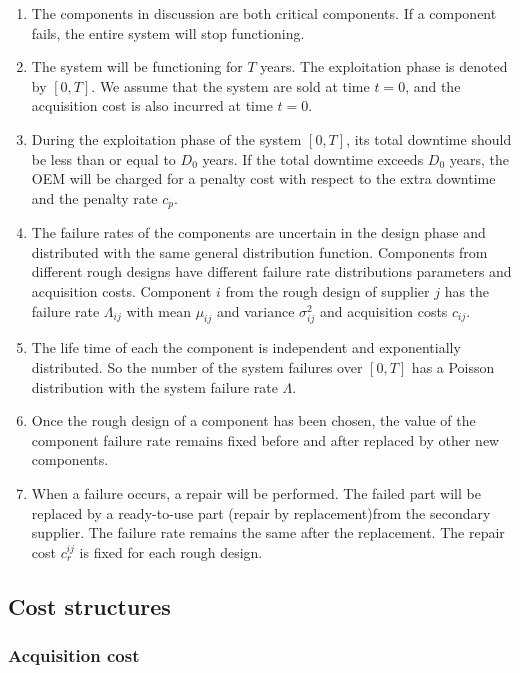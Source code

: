 \documentclass[preprint,12pt]{elsarticle}
\begin{document}
   \begin{enumerate}
   \item The components in discussion are both critical components. If a component fails, the entire system will stop functioning.
  \item The system will be functioning for $T$ years. The exploitation phase is denoted by $[0, T]$. We assume that the system are sold at time $t=0$, and the acquisition cost is also incurred at time $t=0$.
	 \item During the exploitation phase of the system $[0, T]$, its total downtime should be less than or equal to $D_0$ years. If the total downtime exceeds $D_0$ years, the OEM will be charged for a penalty cost with respect to the extra downtime and the penalty rate $c_p$.
	 \item The failure rates of the components are uncertain in the design phase and distributed with the same general distribution function. Components from different rough designs have different failure rate distributions parameters and acquisition costs. Component $i$ from the rough design of supplier $j$ has the failure rate $\Lambda_{ij}$ with mean $\mu_{ij}$ and variance $\sigma_{ij}^2$ and acquisition costs $c_{ij}$.
	 \item The life time of each the component is independent and exponentially distributed. So the number of the system failures over $[0, T]$ has a Poisson distribution with the system failure rate $\Lambda$.
		\item	Once the rough design of a component has been chosen, the value of the component failure rate remains fixed before and after replaced by other new components.
  \item When a failure occurs, a repair will be performed. The failed part will be replaced by a ready-to-use part (repair by replacement)from the secondary supplier. The failure rate remains the same after the replacement. The repair cost $c_r^{ij}$ is fixed for each rough design.
 	
	\end{enumerate}
	
\subsection{Cost structures}

\subsubsection{Acquisition cost}
	
\end{document}
